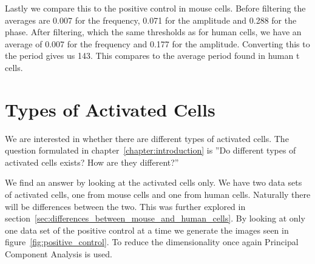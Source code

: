 Lastly we compare this to the positive control in mouse cells. Before filtering the averages are 0.007 for the frequency, 0.071 for the amplitude and 0.288 for the phase. After filtering, which the same thresholds as for human cells, we have an average of 0.007 for the frequency and 0.177 for the amplitude. Converting this to the period gives us 143. This compares to the average period found in human t cells.

\section{Types of Activated Cells}

We are interested in whether there are different types of activated cells. The question formulated in chapter~\ref{chapter:introduction} is ''Do different types of activated cells exists? How are they different?''

We find an answer by looking at the activated cells only. We have two data sets of activated cells, one from mouse cells and one from human cells. Naturally there will be differences between the two. This was further explored in section~\ref{sec:differences_between_mouse_and_human_cells}. By looking at only one data set of the positive control at a time we generate the images seen in figure~\ref{fig:positive_control}. To reduce the dimensionality once again Principal Component Analysis is used.

